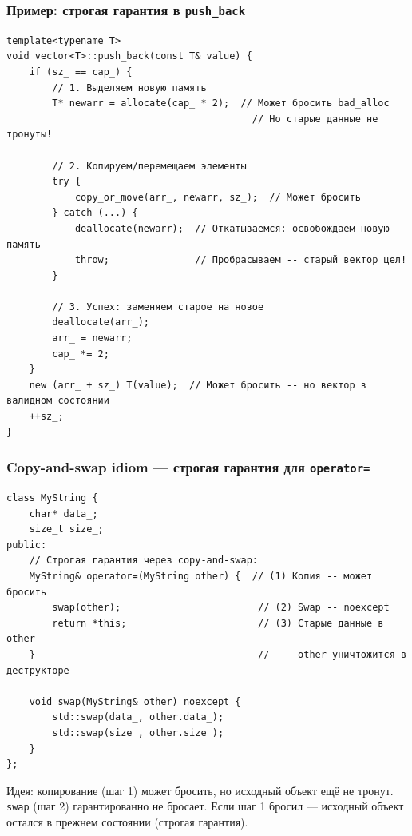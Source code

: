 \documentclass[a4paper,12pt]{article}
\begin{document}
\subsubsection{Пример: строгая гарантия в \texttt{push\_back}}

\begin{lstlisting}
template<typename T>
void vector<T>::push_back(const T& value) {
    if (sz_ == cap_) {
        // 1. Выделяем новую память
        T* newarr = allocate(cap_ * 2);  // Может бросить bad_alloc
                                           // Но старые данные не тронуты!

        // 2. Копируем/перемещаем элементы
        try {
            copy_or_move(arr_, newarr, sz_);  // Может бросить
        } catch (...) {
            deallocate(newarr);  // Откатываемся: освобождаем новую память
            throw;               // Пробрасываем -- старый вектор цел!
        }

        // 3. Успех: заменяем старое на новое
        deallocate(arr_);
        arr_ = newarr;
        cap_ *= 2;
    }
    new (arr_ + sz_) T(value);  // Может бросить -- но вектор в валидном состоянии
    ++sz_;
}
\end{lstlisting}

\subsubsection{Copy-and-swap idiom --- строгая гарантия для \texttt{operator=}}

\begin{lstlisting}
class MyString {
    char* data_;
    size_t size_;
public:
    // Строгая гарантия через copy-and-swap:
    MyString& operator=(MyString other) {  // (1) Копия -- может бросить
        swap(other);                        // (2) Swap -- noexcept
        return *this;                       // (3) Старые данные в other
    }                                       //     other уничтожится в деструкторе

    void swap(MyString& other) noexcept {
        std::swap(data_, other.data_);
        std::swap(size_, other.size_);
    }
};
\end{lstlisting}

Идея: копирование (шаг 1) может бросить, но исходный объект ещё не тронут.
\texttt{swap} (шаг 2) гарантированно не бросает. Если шаг 1 бросил ---
исходный объект остался в прежнем состоянии (строгая гарантия).

\end{document}
